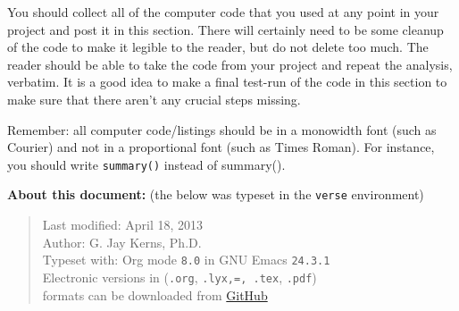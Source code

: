 \documentclass[11pt]{article}
\begin{document}
You should collect all of the computer code that you used at any point
in your project and post it in this section. There will certainly need
to be some cleanup of the code to make it legible to the reader, but
do not delete too much. The reader should be able to take the code
from your project and repeat the analysis, verbatim. It is a good idea
to make a final test-run of the code in this section to make sure that
there aren't any crucial steps missing.

Remember: all computer code/listings should be in a monowidth font
(such as Courier) and not in a proportional font (such as Times
Roman). For instance, you should write \texttt{summary()} instead of
summary().

\bigskip

\textbf{About this document:} (the below was typeset in the \texttt{verse}
environment)

\begin{verse}
Last modified: April 18, 2013 \\
Author: G. Jay Kerns, Ph.D. \\
Typeset with: Org mode \texttt{8.0} in GNU Emacs \texttt{24.3.1} \\
Electronic versions in (\texttt{.org}, \texttt{.lyx,=, .tex}, \texttt{.pdf}) \\
formats can be downloaded from \href{https://github.com/gjkerns/gradproject}{GitHub} \\
\end{verse}
\end{document}

